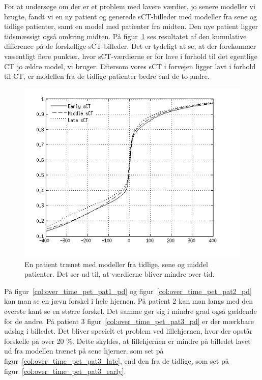 For at undersøge om der er et problem med lavere værdier, jo senere modeller vi brugte, fandt vi en ny patient og generede sCT-billeder med modeller fra sene og tidlige patienter, samt en model med patienter fra midten. Den nye patient ligger tidsmæssigt også omkring midten. På figur~\ref{cumm_diff_over_tid} ses resultatet af den kumulative difference på de forskellige sCT-billeder. Det er tydeligt at se, at der forekommer væsentligt flere punkter, hvor sCT-værdierne er for lave i forhold til det egentlige CT jo ældre model, vi bruger. Eftersom vores sCT i forvejen ligger lavt i forhold til CT, er modellen fra de tidlige patienter bedre end de to andre.

\begin{figure}[H]
    \includegraphics[width=\textwidth]{billeder/cumm_diff_over_tid.png}
    \caption{En patient trænet med modeller fra tidlige, sene og middel patienter. Det ser ud til, at værdierne bliver mindre over tid.}
    \label{cumm_diff_over_tid}
\end{figure}

På figur~\ref{col:over_time_pet_pat1_pd} og
figur~\ref{col:over_time_pet_pat2_pd} kan man se en jævn forskel i hele
hjernen. På patient 2 kan man langs med den øverste kant se en større
forskel. Det samme gør sig i mindre grad også gældende for de andre.
På patient 3 figur~\ref{col:over_time_pet_pat3_pd} er der mærkbare
udslag i billedet. Det bliver specielt et problem ved lillehjernen, hvor
der opstår forskelle på over 20 \%. Dette skyldes, at lillehjernen
er mindre på billedet lavet ud fra modellen trænet på sene hjerner, som set på figur~\ref{col:over_time_pet_pat3_late}, end den fra de tidlige, som set på figur~\ref{col:over_time_pet_pat3_early}.

